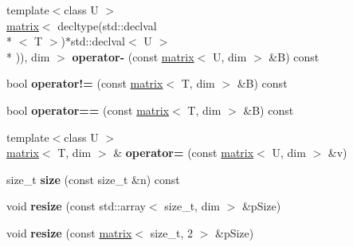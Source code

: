 \begin{DoxyCompactItemize}
\item 
\hypertarget{classkeycpp_1_1matrix_aa4e52087fbf70c471a215981e84682cd}{{\footnotesize template$<$class U $>$ }\\\hyperlink{classkeycpp_1_1matrix}{matrix}$<$ decltype(std\-::declval\\*
$<$ T $>$)$\ast$std\-::declval$<$ U $>$\\*
)), dim $>$ {\bfseries operator-\/} (const \hyperlink{classkeycpp_1_1matrix}{matrix}$<$ U, dim $>$ \&B) const }\label{classkeycpp_1_1matrix_aa4e52087fbf70c471a215981e84682cd}

\item 
\hypertarget{classkeycpp_1_1matrix_aeff29be0826cee275df82ce9e109873f}{bool {\bfseries operator!=} (const \hyperlink{classkeycpp_1_1matrix}{matrix}$<$ T, dim $>$ \&B) const }\label{classkeycpp_1_1matrix_aeff29be0826cee275df82ce9e109873f}

\item 
\hypertarget{classkeycpp_1_1matrix_a81a97884f2b968ecc48a44c057a4d018}{bool {\bfseries operator==} (const \hyperlink{classkeycpp_1_1matrix}{matrix}$<$ T, dim $>$ \&B) const }\label{classkeycpp_1_1matrix_a81a97884f2b968ecc48a44c057a4d018}

\item 
\hypertarget{classkeycpp_1_1matrix_ac57cc429ad640030fb038c5e9075174a}{{\footnotesize template$<$class U $>$ }\\\hyperlink{classkeycpp_1_1matrix}{matrix}$<$ T, dim $>$ \& {\bfseries operator=} (const \hyperlink{classkeycpp_1_1matrix}{matrix}$<$ U, dim $>$ \&v)}\label{classkeycpp_1_1matrix_ac57cc429ad640030fb038c5e9075174a}

\item 
\hypertarget{classkeycpp_1_1matrix_aae976395cf7fa4eea95deb475e3fe085}{size\-\_\-t {\bfseries size} (const size\-\_\-t \&n) const }\label{classkeycpp_1_1matrix_aae976395cf7fa4eea95deb475e3fe085}

\item 
\hypertarget{classkeycpp_1_1matrix_ad0abc30bb7fc8a2bd0e8998b954a4e65}{void {\bfseries resize} (const std\-::array$<$ size\-\_\-t, dim $>$ \&p\-Size)}\label{classkeycpp_1_1matrix_ad0abc30bb7fc8a2bd0e8998b954a4e65}

\item 
\hypertarget{classkeycpp_1_1matrix_af9b778743153486c7bd4ae4b30c35345}{void {\bfseries resize} (const \hyperlink{classkeycpp_1_1matrix}{matrix}$<$ size\-\_\-t, 2 $>$ \&p\-Size)}\label{classkeycpp_1_1matrix_af9b778743153486c7bd4ae4b30c35345}


\end{DoxyCompactItemize}
